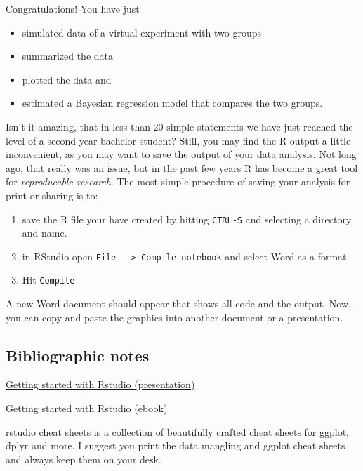 \documentclass[]{svmono}
\providecommand{\tightlist}{%
  \setlength{\itemsep}{0pt}\setlength{\parskip}{0pt}}
\begin{document}
Congratulations! You have just

\begin{itemize}
\tightlist
\item
  simulated data of a virtual experiment with two groups
\item
  summarized the data
\item
  plotted the data and
\item
  estimated a Bayesian regression model that compares the two groups.
\end{itemize}

Isn't it amazing, that in less than 20 simple statements we have just
reached the level of a second-year bachelor student? Still, you may find
the R output a little inconvenient, as you may want to save the output
of your data analysis. Not long ago, that really was an issue, but in
the past few years R has become a great tool for \emph{reproducable
research}. The most simple procedure of saving your analysis for print
or sharing is to:

\begin{enumerate}
\def\labelenumi{\arabic{enumi}.}
\tightlist
\item
  save the R file your have created by hitting \texttt{CTRL-S} and
  selecting a directory and name.
\item
  in RStudio open \texttt{File\ -\/-\textgreater{}\ Compile\ notebook}
  and select Word as a format.
\item
  Hit \texttt{Compile}
\end{enumerate}

A new Word document should appear that shows all code and the output.
Now, you can copy-and-paste the graphics into another document or a
presentation.

\subsection{Bibliographic notes}\label{bibliographic-notes}

\href{http://www.calvin.edu/~rpruim/talks/Rminis/RStartingUp.pdf}{Getting
started with Rstudio (presentation)}

\href{http://it-ebooks.info/book/2253/}{Getting started with Rstudio
(ebook)}

\href{http://www.rstudio.com/resources/cheatsheets/}{rstudio cheat
sheets} is a collection of beautifully crafted cheat sheets for ggplot,
dplyr and more. I suggest you print the data mangling and ggplot cheat
sheets and always keep them on your desk.
\end{document}
